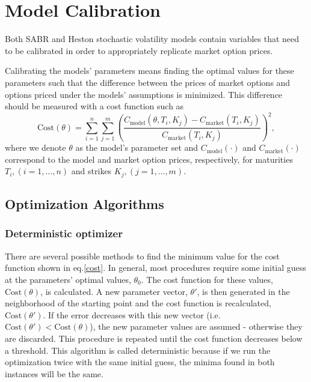  
 
 
\section{Model Calibration}
\label{section:Model Calibration}
Both SABR and Heston stochastic volatility models contain variables that need to be calibrated in order to appropriately replicate market option prices.

Calibrating the models' parameters means finding the optimal values for these parameters such that the difference between the prices of market options and options priced under the models' assumptions is minimized. This difference should be measured with a cost function such as
\begin{equation}\label{cost}
\mathrm{Cost}(\theta)=\sum_{i=1}^n\sum_{j=1}^m\left(\frac{C_{\mathrm{model}}(\theta,T_i,K_j)-C_{\mathrm{market}}(T_i,K_j)}{C_{\mathrm{market}}(T_i,K_j)}\right)^2,
\end{equation}
\noindent where we denote $\theta$ as the model's parameter set and $C_{\mathrm{model}}(\cdot)$ and $C_{\mathrm{market}}(\cdot)$ correspond to the model and market option prices, respectively, for maturities $T_i,(i=1,\ldots,n)$ and strikes $K_j,(j=1,\ldots,m)$.

\subsection{Optimization Algorithms}
\subsubsection{Deterministic optimizer}
There are several possible methods to find the minimum value for the cost function shown in eq.\eqref{cost}. In general, most procedures require some initial guess at the parameters' optimal values, $\theta_0$. The cost function for these values, $\mathrm{Cost}(\theta)$, is calculated. A new parameter vector, $\theta'$, is then generated in the neighborhood of the starting point and the cost function is recalculated, $\mathrm{Cost}(\theta')$. If the error decreases with this new vector (i.e. $\mathrm{Cost}(\theta')<\mathrm{Cost}(\theta)$), the new parameter values are assumed - otherwise they are discarded. This procedure is repeated until the cost function decreases below a threshold.
This algorithm is called deterministic because if we run the optimization twice with the same initial guess, the minima found in both instances will be the same.

